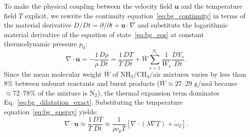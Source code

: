 To make the physical coupling between the velocity field $\mathbf{u}$ and the temperature field $T$ explicit, we rewrite the continuity equation~\eqref{eq:bg_continuity} in terms of the material derivative $D/Dt = \partial/\partial t + \mathbf{u} \cdot \nabla$ and substitute the logarithmic material derivative of the equation of state~\eqref{eq:bg_eos} at constant thermodynamic pressure $p_0$:
\begin{equation}
    \nabla \cdot \mathbf{u} = -\frac{1}{\rho}\frac{D\rho}{Dt} = \frac{1}{T}\frac{DT}{Dt} + \overline{W} \sum_{s=1}^{N_s} \frac{1}{W_s}\frac{DY_s}{Dt}.
    \label{eq:bg_dilatation_exact}
\end{equation}
Since the mean molecular weight $\overline{W}$ of $\text{NH}_3/\text{CH}_4/\text{air}$ mixtures varies by less than $8\%$ between unburnt reactants and burnt products ($\overline{W} \approx 27\text{--}29\text{ g/mol}$ because $\approx 72\text{--}78\%$ of the mixture is $\text{N}_2$), the thermal expansion term dominates Eq.~\eqref{eq:bg_dilatation_exact}. Substituting the temperature equation~\eqref{eq:bg_energy} yields:
\begin{equation}
    \nabla \cdot \mathbf{u} \approx \frac{1}{T}\frac{DT}{Dt} \approx \frac{1}{\rho c_p T}\left[\nabla \cdot (\lambda \nabla T) + \dot{\omega}_T\right].
    \label{eq:bg_dilatation_thermal}
\end{equation}

